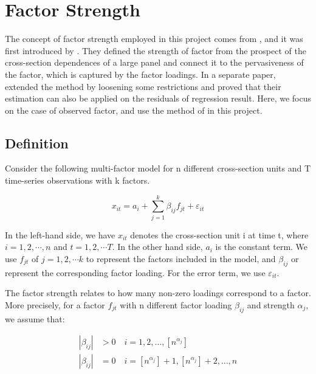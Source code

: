 \chapter{Factor Strength}\label{strength}
The concept of factor strength employed in this project comes from , and it was first introduced by .
They defined the strength of factor from the prospect of the cross-section dependences of a large panel and connect it to the pervasiveness of the factor, which is captured by the factor loadings.
In a separate paper,  extended the method by loosening some restrictions and proved that their estimation can also be applied on the residuals of regression result.
Here, we focus on the case of observed factor, and use the method of  in this project.

\section{Definition}\label{strength_definiton}
Consider the following multi-factor model for n different cross-section units and T time-series observations with k  factors.

\[  x_{it} = a_{i}+  \sum_{j=1}^{k}\beta_{ij}f_{jt} + \varepsilon_{it} \tag{1}\label{definition_model} \]

In the left-hand side, we have $x_{it}$ denotes the cross-section unit i at time t, where $i = 1, 2, \cdots, n$ and $t = 1,2, \cdots T$.  
In the other hand side, $a_{i}$ is the constant term.
We use $f_{jt}$ of $j = 1, 2, \cdots k$ to represent the factors included in the model, and $\beta_{ij}$ or represent the corresponding factor loading.
For the error term, we use $\varepsilon_{it}$.

The factor strength relates to how many non-zero loadings correspond to a factor.
More precisely, for a factor $f_{jt}$ with n different factor loading $\beta_{ij}$ and strength $\alpha_j$, we assume that:

\begin{align*}
|\beta_{ij}| &> 0\quad i = 1, 2,  \dots, [n^{\alpha_j}]\\
|\beta_{ij}| &= 0 \quad i = [n^{\alpha_j}] + 1, [n^{\alpha_j}] +2 ,\dots, n
\end{align*}

